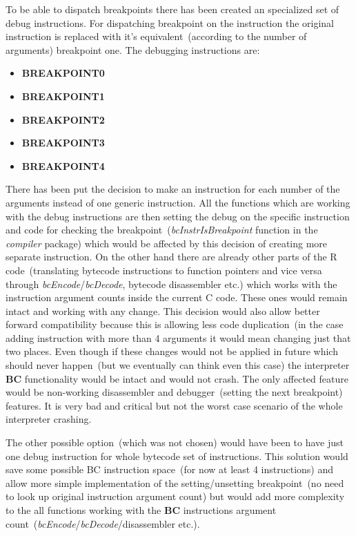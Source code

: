 \documentclass[thesis=M,english]{FITthesis}[2018/10/20]
\begin{document}
To be able to dispatch breakpoints there has been created an specialized set of debug instructions. For dispatching breakpoint on the instruction the original instruction is replaced with it's equivalent~(according to the number of arguments) breakpoint one. The debugging instructions are:

\begin{itemize}
	\item \textbf{BREAKPOINT0}
	\item \textbf{BREAKPOINT1}
	\item \textbf{BREAKPOINT2}
	\item \textbf{BREAKPOINT3}
	\item \textbf{BREAKPOINT4}
\end{itemize}

There has been put the decision to make an instruction for each number of the arguments instead of one generic instruction. All the functions which are working with the debug instructions are then setting the debug on the specific instruction and code for checking the breakpoint~(\textit{bcInstrIsBreakpoint} function in the \textit{compiler} package) which would be affected by this decision of creating more separate instruction. On the other hand there are already other parts of the R code~(translating bytecode instructions to function pointers and vice versa through \textit{bcEncode}/\textit{bcDecode}, bytecode disassembler etc.) which works with the instruction argument counts inside the current C code. These ones would remain intact and working with any change. This decision would also allow better forward compatibility because this is allowing less code duplication~(in the case adding instruction with more than 4 arguments it would mean changing just that two places. Even though if these changes would not be applied in future which should never happen~(but we eventually can think even this case) the interpreter \textbf{BC} functionality would be intact and would not crash. The only affected feature would be non-working disassembler and debugger~(setting the next breakpoint) features. It is very bad and critical but not the worst case scenario of the whole interpreter crashing.

The other possible option~(which was not chosen) would have been to have just one debug instruction for whole bytecode set of instructions. This solution would save some possible BC instruction space~(for now at least 4 instructions) and allow more simple implementation of the setting/unsetting breakpoint~(no need to look up original instruction argument count) but would add more complexity to the all functions working with the \textbf{BC} instructions argument count~(\textit{bcEncode}/\textit{bcDecode}/disassembler etc.).
\end{document}
